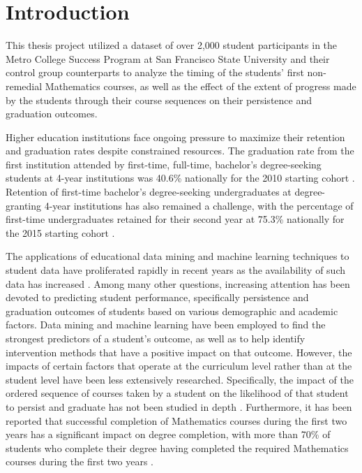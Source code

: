 \nocite{*}

\chapter{Introduction}

This thesis project utilized a dataset of over 2,000 student participants in the Metro College Success Program at San Francisco State University and their control group counterparts to analyze the timing of the students' first non-remedial Mathematics courses, as well as the effect of the extent of progress made by the students through their course sequences on their persistence and graduation outcomes.  

Higher education institutions face ongoing pressure to maximize their retention and graduation rates despite constrained resources.  The graduation rate from the first institution attended by first-time, full-time, bachelor's degree-seeking students at 4-year institutions was 40.6\% nationally for the 2010 starting cohort \cite{NCES_grad}.  Retention of first-time bachelor's degree-seeking undergraduates at degree-granting 4-year institutions has also remained a challenge, with the percentage of first-time undergraduates retained for their second year at 75.3\% nationally for the 2015 starting cohort \cite{NCES_pers}.

The applications of educational data mining and machine learning techniques to student data have proliferated rapidly in recent years as the availability of such data has increased \cite{Romero_2007, Romero_2010, Asif}.  Among many other questions, increasing attention has been devoted to predicting student performance, specifically persistence and graduation outcomes of students based on various demographic and academic factors.  Data mining  \cite{Saa, Shahiri, Asif} and machine learning \cite{Romero_2010, Gopalakrishnan} have been employed to find the strongest predictors of a student's outcome, as well as to help identify intervention methods that have a positive impact on that outcome.  However, the impacts of certain factors that operate at the curriculum level rather than at the student level have been less extensively researched.  Specifically, the impact of the ordered sequence of courses taken by a student on the likelihood of that student to persist and graduate has not been studied in depth \cite{Bhaskaran}.  Furthermore, it has been reported that successful completion of Mathematics courses during the first two years has a significant impact on degree completion, with more than 70\% of students who complete their degree having completed the required Mathematics courses during the first two years \cite{Bhaskaran}.

